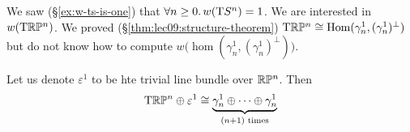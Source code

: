 
\lecture{}

\begin{node}
We saw (\S\ref{ex:w-ts-is-one}) that $\forall n\geq0\ldotp w(\mathrm{T}S^{n})=1$.
We are interested in $w(\mathrm{T}\mathbb{R}\mathbb{P}^{n})$.
We proved (\S\ref{thm:lec09:structure-theorem}) $\mathrm{T}\mathbb{R}\mathbb{P}^{n}\cong\operatorname{Hom}(\gamma^{1}_{n},(\gamma^{1}_{n})^{\perp})$
but do not know how to compute $w\bigl(\hom(\gamma^{1}_{n},(\gamma^{1}_{n})^{\perp})\bigr)$.
\end{node}

\begin{theorem}
Let us denote $\varepsilon^{1}$ to be hte trivial line bundle over $\mathbb{R}\mathbb{P}^{n}$.
Then
\begin{equation}
\mathrm{T}\mathbb{R}\mathbb{P}^{n}\oplus\varepsilon^{1}\cong\underbrace{\gamma^{1}_{n}\oplus\dots\oplus\gamma^{1}_{n}}_{(n+1)\text{~times}}
\end{equation}
\end{theorem}

